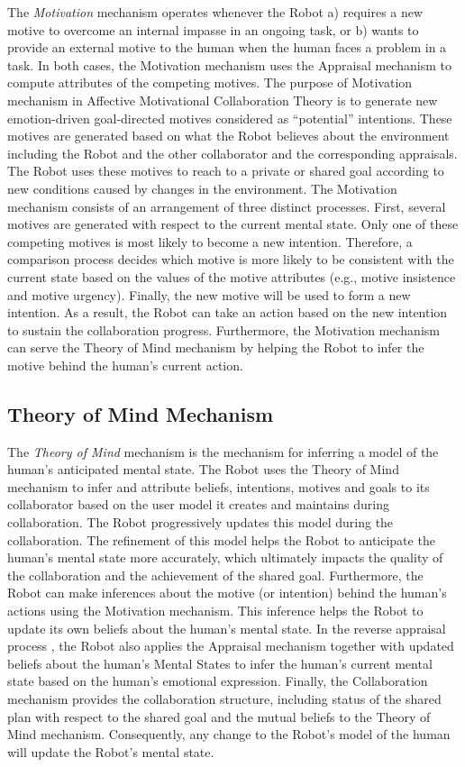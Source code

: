 The \textit{Motivation} mechanism operates whenever the Robot a) requires a new
motive to overcome an internal impasse in an ongoing task, or b) wants to
provide an external motive to the human when the human faces a problem in a
task. In both cases, the Motivation mechanism uses the Appraisal mechanism to
compute attributes of the competing motives. The purpose of Motivation mechanism
in Affective Motivational Collaboration Theory is to generate new emotion-driven
goal-directed motives considered as ``potential'' intentions. These motives are
generated based on what the Robot believes about the environment including the
Robot and the other collaborator and the corresponding appraisals. The Robot
uses these motives to reach to a private or shared goal according to new
conditions caused by changes in the environment. The Motivation mechanism
consists of an arrangement of three distinct processes. First, several motives
are generated with respect to the current mental state. Only one of these
competing motives is most likely to become a new intention. Therefore, a
comparison process decides which motive is more likely to be consistent with the
current state based on the values of the motive attributes (e.g., motive
insistence and motive urgency). Finally, the new motive will be used to form a
new intention. As a result, the Robot can take an action based on the new
intention to sustain the collaboration progress. Furthermore, the Motivation
mechanism can serve the Theory of Mind mechanism by helping the Robot to infer
the motive behind the human's current action.

\subsection{Theory of Mind Mechanism}
\label{sec:tom-mech}

The \textit{Theory of Mind} mechanism is the mechanism for inferring a model of
the human's anticipated mental state. The Robot uses the Theory of Mind
mechanism to infer and attribute beliefs, intentions, motives and goals to its
collaborator based on the user model it creates and maintains during
collaboration. The Robot progressively updates this model during the
collaboration. The refinement of this model helps the Robot to anticipate the
human's mental state more accurately, which ultimately impacts the quality of
the collaboration and the achievement of the shared goal. Furthermore, the Robot
can make inferences about the motive (or intention) behind the human's actions
using the Motivation mechanism. This inference helps the Robot to update its own
beliefs about the human's mental state. In the reverse appraisal process
\cite{gratch:reverse-appraisal}, the Robot also applies the Appraisal mechanism
together with updated beliefs about the human's Mental States to infer the
human's current mental state based on the human's emotional expression. Finally,
the Collaboration mechanism provides the collaboration structure, including
status of the shared plan with respect to the shared goal and the mutual beliefs
to the Theory of Mind mechanism. Consequently, any change to the Robot's model
of the human will update the Robot's mental state.

